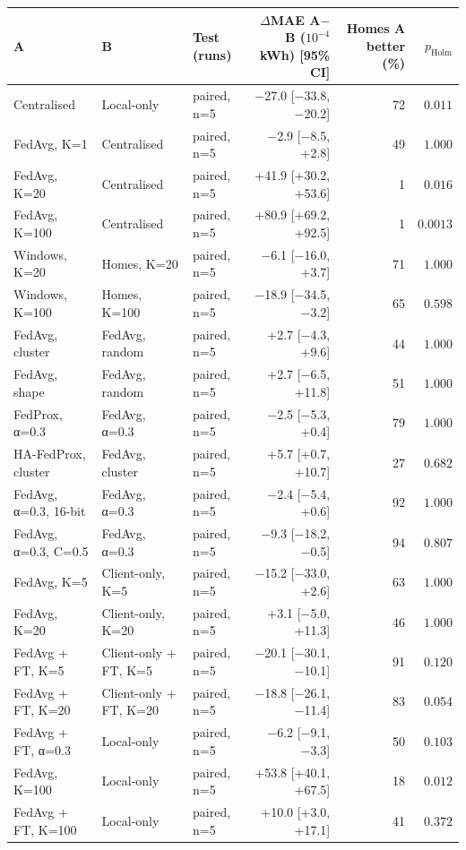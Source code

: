 \begin{tabular}{lllrrr}
\toprule
A & B & Test (runs) & $\Delta$MAE A$-$B ($10^{-4}$ kWh) [95\% CI] & Homes A better (\%) & $p_{\mathrm{Holm}}$ \\
\midrule
Centralised & Local-only & paired, n=5 & −27.0 [−33.8, −20.2] & 72 & $0.011$ \\
FedAvg, K=1 & Centralised & paired, n=5 & −2.9 [−8.5, +2.8] & 49 & $1.000$ \\
FedAvg, K=20 & Centralised & paired, n=5 & +41.9 [+30.2, +53.6] & 1 & $0.016$ \\
FedAvg, K=100 & Centralised & paired, n=5 & +80.9 [+69.2, +92.5] & 1 & $0.0013$ \\
Windows, K=20 & Homes, K=20 & paired, n=5 & −6.1 [−16.0, +3.7] & 71 & $1.000$ \\
Windows, K=100 & Homes, K=100 & paired, n=5 & −18.9 [−34.5, −3.2] & 65 & $0.598$ \\
FedAvg, cluster & FedAvg, random & paired, n=5 & +2.7 [−4.3, +9.6] & 44 & $1.000$ \\
FedAvg, shape & FedAvg, random & paired, n=5 & +2.7 [−6.5, +11.8] & 51 & $1.000$ \\
FedProx, α=0.3 & FedAvg, α=0.3 & paired, n=5 & −2.5 [−5.3, +0.4] & 79 & $1.000$ \\
HA-FedProx, cluster & FedAvg, cluster & paired, n=5 & +5.7 [+0.7, +10.7] & 27 & $0.682$ \\
FedAvg, α=0.3, 16-bit & FedAvg, α=0.3 & paired, n=5 & −2.4 [−5.4, +0.6] & 92 & $1.000$ \\
FedAvg, α=0.3, C=0.5 & FedAvg, α=0.3 & paired, n=5 & −9.3 [−18.2, −0.5] & 94 & $0.807$ \\
FedAvg, K=5 & Client-only, K=5 & paired, n=5 & −15.2 [−33.0, +2.6] & 63 & $1.000$ \\
FedAvg, K=20 & Client-only, K=20 & paired, n=5 & +3.1 [−5.0, +11.3] & 46 & $1.000$ \\
FedAvg + FT, K=5 & Client-only + FT, K=5 & paired, n=5 & −20.1 [−30.1, −10.1] & 91 & $0.120$ \\
FedAvg + FT, K=20 & Client-only + FT, K=20 & paired, n=5 & −18.8 [−26.1, −11.4] & 83 & $0.054$ \\
FedAvg + FT, α=0.3 & Local-only & paired, n=5 & −6.2 [−9.1, −3.3] & 50 & $0.103$ \\
FedAvg, K=100 & Local-only & paired, n=5 & +53.8 [+40.1, +67.5] & 18 & $0.012$ \\
FedAvg + FT, K=100 & Local-only & paired, n=5 & +10.0 [+3.0, +17.1] & 41 & $0.372$ \\

\end{tabular}
